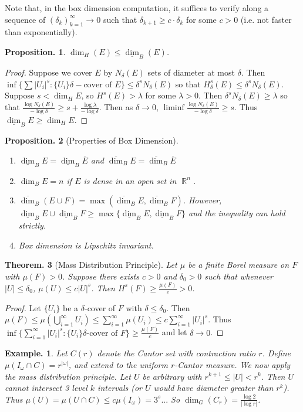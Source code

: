 \documentclass[11pt, a4paper]{memoir}
\DeclareMathOperator{\R}{{\mathbb{R}}}
\theoremstyle{change}
\newtheorem{theorem}{Theorem.}[section]
\newtheorem{proposition}[theorem]{Proposition.}
\theoremstyle{plain}
\theoremstyle{nonumberplain}
\newtheorem{example}{Example.}
\newtheorem{proof}{Proof}
\newcommand{\ubdim}{\ensuremath{\overline{\dim}_B}}
\newcommand{\lbdim}{\ensuremath{\underline{\dim}_B}}
\numberwithin{equation}{section}
\begin{document}
Note that, in the box dimension computation, it suffices to verify along a sequence of $(\delta_k)_{k=1}^\infty\to 0$ such that $\delta_{k+1}\geq c\cdot\delta_k$ for some $c>0$ (i.e. not faster than exponentially).
\begin{proposition}
    $\dim_H(E)\leq\lbdim(E)$.
\end{proposition}
\begin{proof}
    Suppose we cover $E$ by $N_\delta(E)$ sets of diameter at most $\delta$.
    Then $\inf\{\sum|U_i|^s:\{U_i\}\delta-\text{cover of }E\}\leq\delta^sN_\delta(E)$ so that $H^s_\delta(E)\leq\delta^sN_\delta(E)$.
    Suppose $s<\dim_H E$, so $H^s(E)>\lambda$ for some $\lambda>0$.
    Then $\delta^sN_\delta(E)\geq\lambda$ so that $\frac{\log N_\delta(E)}{-\log\delta}\geq s+\frac{\log\lambda}{-\log\delta}$.
    Then as $\delta\to 0$, $\liminf\frac{\log N_\delta(E)}{-\log\delta}\geq s$.
    Thus $\lbdim E\geq\dim_H E$.
\end{proof}
\begin{proposition}[Properties of Box Dimension]
    \begin{enumerate}[nl,r]
        \item $\lbdim E=\lbdim\overline{E}$ and $\ubdim E=\ubdim\overline{E}$
        \item $\dim_B E=n$ if $E$ is dense in an open set in $\R^n$.
        \item $\ubdim(E\cup F)=\max(\ubdim E,\ubdim F)$.
            However, $\lbdim E\cup\lbdim F\geq\max\{\lbdim E,\lbdim F\}$ and the inequality can hold strictly.
        \item Box dimension is Lipschitz invariant.
    \end{enumerate}
\end{proposition}
\begin{theorem}[Mass Distribution Principle]
    Let $\mu$ be a finite Borel measure on $F$ with $\mu(F)>0$.
    Suppose there exists $c>0$ and $\delta_0>0$ such that whenever $|U|\leq\delta_0$, $\mu(U)\leq c|U|^s$.
    Then $H^s(F)\geq\frac{\mu(F)}{c}>0$.
\end{theorem}
\begin{proof}
    Let $\{U_i\}$ be a $\delta$-cover of $F$ with $\delta\leq\delta_0$.
    Then $\mu(F)\leq\mu\left(\bigcup_{i=1}^\infty U_i\right)\leq\sum_{i=1}^\infty\mu(U_i)\leq c\sum_{i=1}^\infty|U_i|^s$.
    Thus $\inf\{\sum_{i=1}^\infty|U_i|^s:\{U_i\}\delta\text{-cover of }F\}\geq\frac{\mu(F)}{c}$ and let $\delta\to 0$.
\end{proof}
\begin{example}
    Let $C(r)$ denote the Cantor set with contraction ratio $r$.
    Define $\mu(I_\omega\cap C)=r^{|\omega|}$, and extend to the uniform $r$-Cantor measure.
    We now apply the mass distribution principle.
    Let $U$ be arbitrary with $r^{k+1}\leq|U|<r^k$.
    Then $U$ cannot intersect 3 level $k$ intervals (or $U$ would have diameter greater than $r^k$).
    Thus $\mu(U)=\mu(U\cap C)\leq c\mu(I_\omega)=3^s...$
    So $\dim_G(C_r)=\frac{\log 2}{|\log r|}$.
\end{example}
\end{document}
